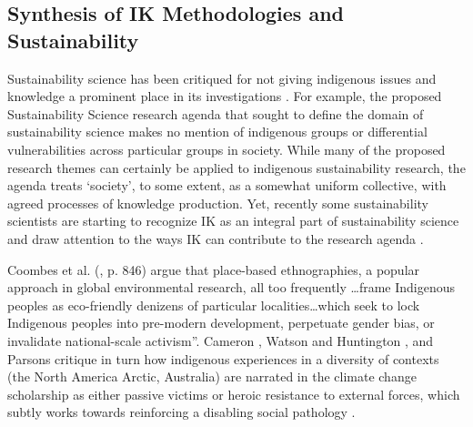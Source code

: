 \documentclass[10pt,a4paper]{article}
\begin{document}
\begin{multicols}{2}
\section{Synthesis of IK Methodologies and Sustainability}
\noindent Sustainability science has been critiqued for not giving indigenous issues and knowledge a prominent place in its investigations \citep{r21}. For example, the proposed Sustainability Science research agenda \citep{r22} that sought to define the domain of sustainability science makes no mention of indigenous groups or differential vulnerabilities across particular groups in society. While many of the proposed research themes can certainly be applied to indigenous sustainability research, the agenda treats `society', to some extent, as a somewhat uniform collective, with agreed processes of knowledge production. Yet, recently some sustainability scientists are starting to recognize IK as an integral part of sustainability science and draw attention to the ways IK can contribute to the research agenda \citep{r21, r14}.


Coombes et al. (\citep{r26}, p. 846) argue that place-based ethnographies, a popular approach in global environmental research, all too frequently \ldots frame Indigenous peoples as eco-friendly denizens of particular localities\ldots which seek to lock Indigenous peoples into pre-modern development, perpetuate gender bias, or invalidate national-scale activism''. Cameron \citep{r27}, Watson and Huntington \citep{r28}, and Parsons \citep{r25} critique in turn how indigenous experiences in a diversity of contexts (the North America Arctic, Australia) are narrated in the climate change scholarship as either passive victims or heroic resistance to external forces, which subtly works towards reinforcing a disabling social pathology \citep{r29}.


\end{multicols}
\end{document}
